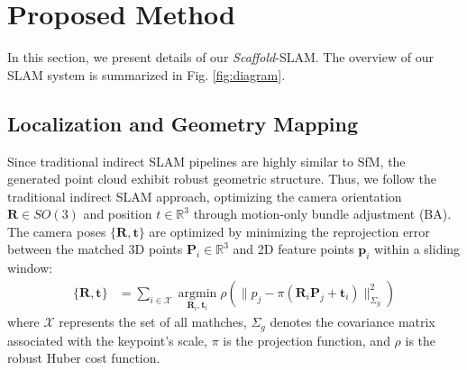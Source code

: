 \section{Proposed Method}
\label{sec:method}
In this section, we present details of our \emph{Scaffold}-SLAM. The overview of our SLAM system is summarized in Fig. \ref{fig:diagram}.


\subsection{Localization and Geometry Mapping}
Since traditional indirect SLAM pipelines are highly similar to SfM, the generated point cloud exhibit robust geometric structure. Thus, we follow the traditional indirect SLAM approach, optimizing the camera orientation $\mathrm{\mathbf{R}}\in SO(3)$ and position $t\in \mathbb{R}^3$ through motion-only bundle adjustment (BA). The camera poses $\{\mathrm{\mathbf{R}},\mathrm{\mathbf{t}}\}$  are optimized by minimizing the reprojection error between the matched 3D points $\mathrm{\mathbf{P}}_i\in \mathbb{R}^3$ and 2D feature points $\mathrm{\mathbf{p}}_i$ within a sliding window:
\begin{align}
\{\mathrm{\mathbf{R}},\mathrm{\mathbf{t}}\}&=  \sum_{i\in\mathcal{X}} \mathop{\mathrm{argmin}}\limits_{\mathrm{\mathbf{R}}_i,\mathrm{\mathbf{t}}_i}  \rho(\|p_j - \pi(\mathrm{\mathbf{R}}_i\mathrm{\mathbf{P}}_j+\mathrm{\mathbf{t}}_i) \|^2_{\Sigma_g}) 
\end{align}
where $\mathcal{X}$ represents the set of all mathches, $\Sigma_g$ denotes the covariance matrix associated with the keypoint's scale, $\pi$ is the projection function, and $\rho$ is the robust Huber cost function. 

